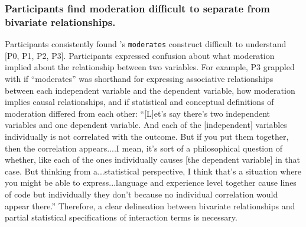 \subsubsection{Participants find moderation difficult to separate from bivariate relationships.}
Participants consistently found \tisane's \texttt{moderates}
construct difficult to understand [P0, P1, P2, P3]. Participants expressed
confusion about what moderation implied about the relationship between
two variables. For example, P3 grappled with if ``moderates'' was shorthand for
expressing associative relationships between each independent variable and the
dependent variable, how moderation implies causal relationships, and if
statistical and conceptual definitions of moderation differed from each other:
``[L]et's say there's two independent variables and one dependent variable. And
each of the [independent] variables individually is not correlated with the
outcome. But if you put them together, then the correlation appears....I mean,
it's sort of a philosophical question of whether, like each of the ones
individually causes [the dependent variable] in that case. But thinking from
a...statistical perspective, I think that's a situation where you might be able
to express...language and experience level together cause lines of code but
individually they don't because no individual correlation would appear there.''
Therefore, a clear delineation between bivariate relationships and partial statistical specifications of interaction terms is necessary. 

